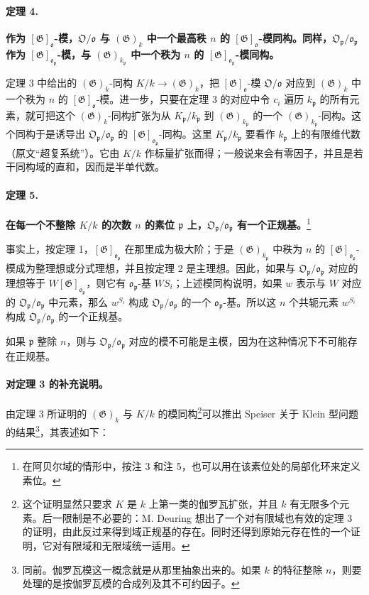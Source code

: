 \documentclass[11pt]{article}
\newcommand{\frakO}{\mathfrak O}
\newcommand{\frako}{\mathfrak o}
\newcommand{\frakp}{\mathfrak p}
\newcommand{\Gg}{\mathfrak G}
\newcommand{\srcemph}[1]{\textbf{#1}}
\begin{document}
\paragraph{定理 4.}
\srcemph{作为 \([\Gg]_\frako\)-模，\(\frakO/\frako\) 与 \((\Gg)_k\) 中一个最高秩 \(n\) 的 \([\Gg]_\frako\)-模同构。同样，\(\frakO_\frakp/\frako_\frakp\) 作为 \([\Gg]_{\frako_\frakp}\)-模，与 \((\Gg)_{k_\frakp}\) 中一个秩为 \(n\) 的 \([\Gg]_{\frako_\frakp}\)-模同构。}

定理 3 中给出的 \((\Gg)_k\)-同构 \(K/k\to(\Gg)_k\)，把 \([\Gg]_\frako\)-模 \(\frakO/\frako\) 对应到 \((\Gg)_k\) 中一个秩为 \(n\) 的 \([\Gg]_\frako\)-模。进一步，只要在定理 3 的对应中令 \(c_i\) 遍历 \(k_\frakp\) 的所有元素，就可把这个 \((\Gg)_k\)-同构扩张为从 \(K_\frakp/k_\frakp\) 到 \((\Gg)_{k_\frakp}\) 的一个 \((\Gg)_{k_\frakp}\)-同构。这个同构于是诱导出 \(\frakO_\frakp/\frako_\frakp\) 的 \([\Gg]_{\frako_\frakp}\)-同构。这里 \(K_\frakp/k_\frakp\) 要看作 \(k_\frakp\) 上的有限维代数（原文“超复系统”）。它由 \(K/k\) 作标量扩张而得；一般说来会有零因子，并且是若干同构域的直和，因而是半单代数。

\paragraph{定理 5.}
\srcemph{在每一个不整除 \(K/k\) 的次数 \(n\) 的素位 \(\frakp\) 上，\(\frakO_\frakp/\frako_\frakp\) 有一个正规基。}\footnote{在阿贝尔域的情形中，按注 3 和注 5，也可以用在该素位处的局部化环来定义素位。}

事实上，按定理 1，\([\Gg]_{\frako_\frakp}\) 在那里成为极大阶；于是 \((\Gg)_{k_\frakp}\) 中秩为 \(n\) 的 \([\Gg]_{\frako_\frakp}\)-模成为整理想或分式理想，并且按定理 2 是主理想。因此，如果与 \(\frakO_\frakp/\frako_\frakp\) 对应的理想等于 \(W[\Gg]_{\frako_\frakp}\)，则它有 \(\frako_\frakp\)-基 \(WS_i\)；上述模同构说明，如果 \(w\) 表示与 \(W\) 对应的 \(\frakO_\frakp/\frako_\frakp\) 中元素，那么 \(w^{S_i}\) 构成 \(\frakO_\frakp/\frako_\frakp\) 的一个 \(\frako_\frakp\)-基。所以这 \(n\) 个共轭元素 \(w^{S_i}\) 构成 \(\frakO_\frakp/\frako_\frakp\) 的一个正规基。

如果 \(\frakp\) 整除 \(n\)，则与 \(\frakO_\frakp/\frako_\frakp\) 对应的模不可能是主模，因为在这种情况下不可能存在正规基。

\paragraph{对定理 3 的补充说明。}
由定理 3 所证明的 \((\Gg)_k\) 与 \(K/k\) 的模同构\footnote{这个证明显然只要求 \(K\) 是 \(k\) 上第一类的伽罗瓦扩张，并且 \(k\) 有无限多个元素。后一限制是不必要的：M. Deuring 想出了一个对有限域也有效的定理 3 的证明，由此反过来得到域正规基的存在。同时还得到原始元存在性的一个证明，它对有限域和无限域统一适用。}可以推出 Speiser 关于 Klein 型问题的结果\footnote{同前。伽罗瓦模这一概念就是从那里抽象出来的。如果 \(k\) 的特征整除 \(n\)，则要处理的是按伽罗瓦模的合成列及其不可约因子。}，其表述如下：
\end{document}
